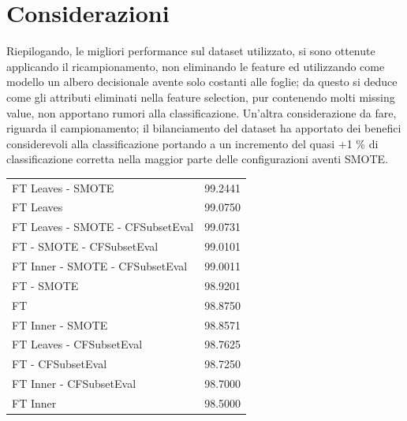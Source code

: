 \section{Considerazioni}
Riepilogando, le migliori performance sul dataset utilizzato, si sono ottenute applicando il ricampionamento, non eliminando le feature ed utilizzando come modello un albero decisionale avente solo costanti alle foglie; da questo si deduce come gli attributi eliminati nella feature selection, pur contenendo molti missing value, non apportano rumori alla classificazione.
Un'altra considerazione da fare, riguarda il campionamento; il bilanciamento del dataset ha apportato dei benefici considerevoli alla classificazione portando a un incremento del quasi +1 \% di classificazione corretta nella maggior parte delle configurazioni aventi SMOTE.

\begin{table}[htbp]
	\begin{tabular}{l r}
		FT Leaves - SMOTE & 99.2441 \\
		FT Leaves & 99.0750 \\
		FT Leaves - SMOTE - CFSubsetEval & 99.0731 \\
		FT - SMOTE - CFSubsetEval & 99.0101 \\
		FT Inner - SMOTE - CFSubsetEval & 99.0011 \\		
		FT - SMOTE & 98.9201 \\
		FT & 98.8750 \\
		FT Inner - SMOTE & 98.8571 \\
		FT Leaves - CFSubsetEval & 98.7625 \\ 
		FT - CFSubsetEval & 98.7250 \\
		FT Inner - CFSubsetEval & 98.7000 \\
		FT Inner & 98.5000 \\
	\end{tabular}
\end{table}